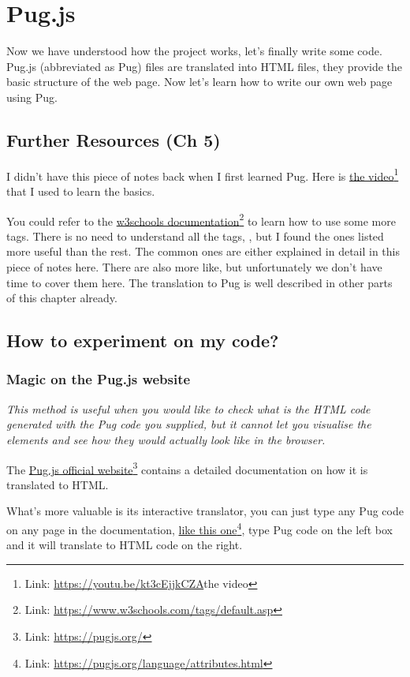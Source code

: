 \chapter{Pug.js}

Now we have understood how the project works, let's finally write some code.
Pug.js (abbreviated as Pug) files are translated into HTML files, they provide the basic structure of the web page. Now let's learn how to write our own web page using Pug.

\section*{Further Resources (Ch 5)}

I didn't have this piece of notes back when I first learned Pug. Here is \href{https://youtu.be/kt3cEjjkCZA}{the video}\footnote{Link: \url{https://youtu.be/kt3cEjjkCZA}{the video}} that I used to learn the basics. 

You could refer to the \href{https://www.w3schools.com/tags/default.asp}{w3schools documentation}\footnote{Link: \url{https://www.w3schools.com/tags/default.asp}} to learn how to use some more tags. There is no need to understand all the tags, , but I found the ones listed more useful than the rest. The common ones are either explained in detail in this piece of notes here. There are also more like, but unfortunately we don't have time to cover them here. The translation to Pug is well described in other parts of this chapter already.

\section{How to experiment on my code?}
\subsection*{Magic on the Pug.js website}

\textit{This method is useful when you would like to check what is the HTML code generated with the Pug code you supplied, but it cannot let you visualise the elements and see how they would actually look like in the browser.}
\vspace{6mm}

The \href{{https://pugjs.org/}}{Pug.js official website}\footnote{Link: \url{https://pugjs.org/}} contains a detailed documentation on how it is translated to HTML.

What's more valuable is its interactive translator, you can just type any Pug code on any page in the documentation, \href{https://pugjs.org/language/attributes.html}{like this one}\footnote{Link: \url{https://pugjs.org/language/attributes.html}}, type Pug code on the left box and it will translate to HTML code on the right.

